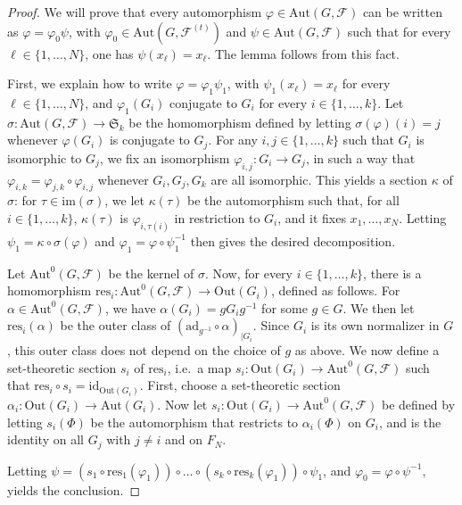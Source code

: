 \documentclass[a4paper,english,11pt]{article}
\theoremstyle{definition}
\theoremstyle{remark}
\newcommand{\Out}{\mathrm{Out}}
\newcommand{\Aut}{\mathrm{Aut}}
\newcommand{\calf}{\mathcal{F}}
\begin{document}
\begin{proof}
We will prove that every automorphism $\varphi\in\Aut(G,\calf)$ can be written as $\varphi=\varphi_0\psi$, with $\varphi_0\in\Aut(G,\calf^{(t)})$ and $\psi\in \Aut(G,\calf)$ such that for every $\ell\in\{1,\dots,N\}$, one has $\psi(x_\ell)=x_\ell$. The lemma follows from this fact.

First, we explain how to write $\varphi=\varphi_1\psi_1$, with $\psi_1(x_\ell)=x_\ell$ for every $\ell\in\{1,\dots,N\}$, and $\varphi_1(G_i)$ conjugate to $G_i$ for every $i\in\{1,\dots,k\}$. Let  $\sigma:\Aut(G,\calf)\to\mathfrak{S}_k$ be the homomorphism defined by letting $\sigma(\varphi)(i)=j$ whenever $\varphi(G_i)$ is conjugate to $G_j$. For any $i,j\in\{1,\dots,k\}$ such that $G_i$ is isomorphic to $G_j$, we fix an isomorphism $\varphi_{i,j}:G_i\to G_j$, in such a way that $\varphi_{i,k}=\varphi_{j,k}\circ\varphi_{i,j}$ whenever $G_i,G_j,G_k$ are all isomorphic. This yields a section $\kappa$ of $\sigma$: for $\tau\in\mathrm{im}(\sigma)$, we let $\kappa(\tau)$ be the automorphism such that, for all $i\in \{1,\dots,k\}$, $\kappa(\tau)$ is $\varphi_{i,\tau(i)}$ in restriction to $G_i$, and it fixes $x_1,\dots,x_N$. Letting $\psi_1=\kappa\circ\sigma(\varphi)$ and $\varphi_1=\varphi\circ\psi_1^{-1}$ then gives the desired decomposition.

Let $\Aut^0(G,\calf)$ be the kernel of $\sigma$. Now, for every $i\in\{1,\dots,k\}$, there is a homomorphism $\mathrm{res}_i:\Aut^0(G,\calf)\to\Out(G_i)$, defined as follows. For $\alpha\in\Aut^0(G,\calf)$, we have $\alpha(G_i)=gG_ig^{-1}$ for some $g\in G$. We then let $\mathrm{res}_i(\alpha)$ be the outer class of $(\mathrm{ad}_{g^{-1}}\circ\alpha)_{|G_i}$. Since $G_i$ is its own normalizer in $G$, this outer class does not depend on the choice of $g$ as above. We now define a set-theoretic section $s_i$ of $\mathrm{res}_i$, i.e.\ a map $s_i:\Out(G_i)\to\Aut^0(G,\calf)$ such that $\mathrm{res}_i\circ s_i=\mathrm{id}_{\Out(G_i)}$. First, choose a set-theoretic section $\alpha_i:\Out(G_i)\to\Aut(G_i)$. Now let $s_i:\Out(G_i)\to\Aut^0(G,\calf)$ be defined by letting $s_i(\Phi)$ be the automorphism that restricts to $\alpha_i(\Phi)$ on $G_i$, and is the identity on all $G_j$ with $j\neq i$ and on $F_N$. 

Letting $\psi=(s_1\circ\mathrm{res}_1(\varphi_1))\circ\dots\circ (s_k\circ\mathrm{res}_k(\varphi_1))\circ\psi_1$, and $\varphi_0=\varphi\circ\psi^{-1}$, yields the conclusion.
\end{proof}

\end{document}
